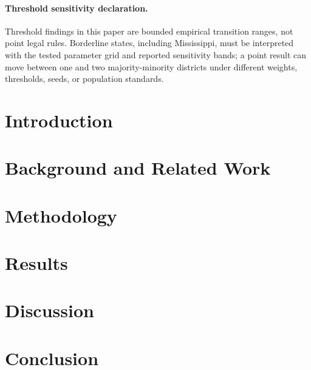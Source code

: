 \documentclass[12pt]{article}
\begin{document}
\paragraph{Threshold sensitivity declaration.} Threshold findings in this paper are bounded empirical transition ranges, not point legal rules. Borderline states, including Mississippi, must be interpreted with the tested parameter grid and reported sensitivity bands; a point result can move between one and two majority-minority districts under different weights, thresholds, seeds, or population standards.

\section{Introduction}


\section{Background and Related Work}


\section{Methodology}


\section{Results}


\section{Discussion}


\section{Conclusion}




\end{document}
